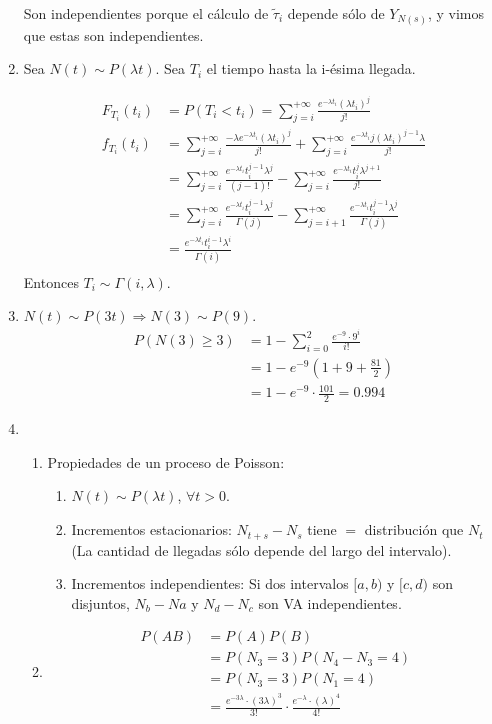 \begin{enumerate}
		 Son independientes porque el cálculo de $\tilde\tau_i$ depende sólo de $Y_{N(s)}$, y vimos que estas son independientes.
	\item
		Sea $N(t) \sim P(\lambda t)$. Sea $T_i$ el tiempo hasta la i-ésima llegada.
		
		\begin{align*}
			F_{T_i}(t_i)	& = P(T_i < t_i) = \sum_{j=i}^{+\infty} \frac{e^{-\lambda t_i}(\lambda t_i)^j}{j!}	\\
			f_{T_i}(t_i)	& = \sum_{j=i}^{+\infty}\frac{-\lambda e^{-\lambda t_i}(\lambda t_i)^j}{j!} + \sum_{j=i}^{+\infty}\frac{e^{-\lambda t_i}j(\lambda t_i)^{j-1}\lambda}{j!}	\\
							& = \sum_{j=i}^{+\infty}\frac{e^{-\lambda t_i}t_i^{j-1}\lambda^j}{(j-1)!} - \sum_{j=i}^{+\infty}\frac{e^{-\lambda t_i}t_i^j \lambda^{j+1}}{j!}				\\
							& = \sum_{j=i}^{+\infty}\frac{e^{-\lambda t_i}t_i^{j-1}\lambda^j}{\Gamma(j)} - \sum_{j=i+1}^{+\infty}\frac{e^{-\lambda t_i}t_i^{j-1}\lambda^j}{\Gamma(j)}	\\
							& = \frac{e^{-\lambda t_i}t_i^{i-1}\lambda^i}{\Gamma(i)}	\\
		\end{align*}
		Entonces $T_i \sim \Gamma(i, \lambda)$.
	\item
		$N(t) \sim P(3t) \Rightarrow N(3) \sim P(9)$.
		\begin{align*}
			P(N(3) \geq 3)	& = 1 - \sum_{i=0}^2 \frac{e^{-9} \cdot 9^i}{i!}	\\
							& = 1 - e^{-9}\left(1 + 9 + \frac{81}{2}\right)	\\
							& = 1 - e^{-9}\cdot\frac{101}{2} = 0.994
		\end{align*}
	\item
		\begin{enumerate}
			\item Propiedades de un proceso de Poisson:
				\begin{enumerate}
					\item $N(t) \sim P(\lambda t)$, $\forall t>0$. 
					\item Incrementos estacionarios: $N_{t+s} - N_s$ tiene $=$ distribución que $N_t$ (La cantidad de llegadas sólo depende del largo del intervalo).
					\item Incrementos independientes: Si dos intervalos $[a,b)$ y $[c,d)$ son disjuntos, $N_{b}-N{a}$ y $N_d - N_c$ son VA independientes.
				\end{enumerate}
			\item
				\begin{align*}
					P(AB)	& = P(A)P(B)					\\
							& = P(N_3 = 3)P(N_4 - N_3 = 4)	\\
							& = P(N_3 = 3)P(N_1 = 4)		\\
							& = \frac{e^{-3\lambda}\cdot(3\lambda)^3}{3!}\cdot \frac{e^{-\lambda}\cdot(\lambda)^4}{4!}
				\end{align*}
		\end{enumerate}
\end{enumerate}
